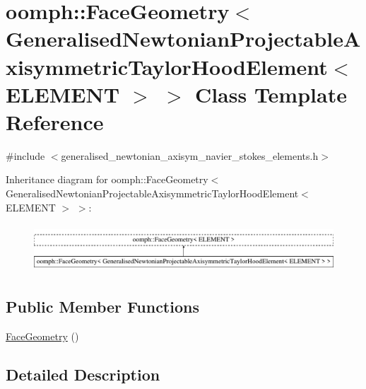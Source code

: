 \hypertarget{classoomph_1_1FaceGeometry_3_01GeneralisedNewtonianProjectableAxisymmetricTaylorHoodElement_3_01ELEMENT_01_4_01_4}{}\section{oomph\+:\+:Face\+Geometry$<$ Generalised\+Newtonian\+Projectable\+Axisymmetric\+Taylor\+Hood\+Element$<$ E\+L\+E\+M\+E\+NT $>$ $>$ Class Template Reference}
\label{classoomph_1_1FaceGeometry_3_01GeneralisedNewtonianProjectableAxisymmetricTaylorHoodElement_3_01ELEMENT_01_4_01_4}


{\ttfamily \#include $<$generalised\+\_\+newtonian\+\_\+axisym\+\_\+navier\+\_\+stokes\+\_\+elements.\+h$>$}

Inheritance diagram for oomph\+:\+:Face\+Geometry$<$ Generalised\+Newtonian\+Projectable\+Axisymmetric\+Taylor\+Hood\+Element$<$ E\+L\+E\+M\+E\+NT $>$ $>$\+:\begin{figure}[H]
\begin{center}
\leavevmode
\includegraphics[height=1.786284cm]{classoomph_1_1FaceGeometry_3_01GeneralisedNewtonianProjectableAxisymmetricTaylorHoodElement_3_01ELEMENT_01_4_01_4}
\end{center}
\end{figure}
\subsection*{Public Member Functions}
\begin{DoxyCompactItemize}
\item 
\hyperlink{classoomph_1_1FaceGeometry_3_01GeneralisedNewtonianProjectableAxisymmetricTaylorHoodElement_3_01ELEMENT_01_4_01_4_a9c7f67adc036f98898ae66ad778706ca}{Face\+Geometry} ()
\end{DoxyCompactItemize}


\subsection{Detailed Description}
